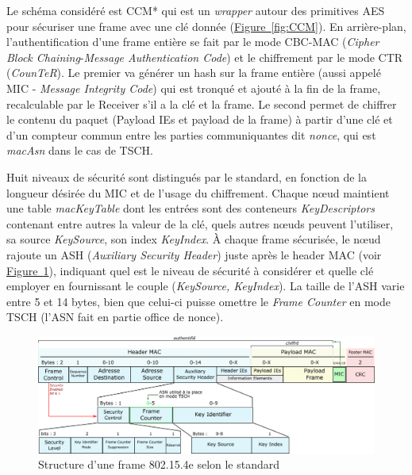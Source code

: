 \documentclass[]{report}
\newcommand{\wordlink}[2]{\hyperref[#2]{#1~\ref{#2}}}
\begin{document}
\par Le schéma considéré est CCM* qui est un \textit{wrapper} autour des primitives AES pour sécuriser une frame avec une clé donnée (\wordlink{Figure}{fig:CCM}). En arrière-plan, l'authentification d'une frame entière se fait par le mode CBC-MAC (\textit{Cipher Block Chaining}-\textit{Message Authentication Code}) et le chiffrement par le mode CTR (\textit{CounTeR}). Le premier va générer un hash sur la frame entière (aussi appelé MIC - \textit{Message Integrity Code}) qui est tronqué et ajouté à la fin de la frame, recalculable par le Receiver s'il a la clé et la frame. Le second permet de chiffrer le contenu du paquet (Payload IEs et payload de la frame) à partir d'une clé et d'un compteur commun entre les parties communiquantes dit \textit{nonce}, qui est \textit{macAsn} dans le cas de TSCH.\\

\par Huit niveaux de sécurité sont distingués par le standard, en fonction de la longueur désirée du MIC et de l'usage du chiffrement. Chaque nœud maintient une table \textit{macKeyTable} dont les entrées sont des conteneurs \textit{KeyDescriptors} contenant entre autres la valeur de la clé, quels autres nœuds peuvent l'utiliser, sa source \textit{KeySource}, son index \textit{KeyIndex}. À chaque frame sécurisée, le nœud rajoute un ASH (\textit{Auxiliary Security Header}) juste après le header MAC (voir \wordlink{Figure}{fig:IEEE802.15.4_frame}), indiquant quel est le niveau de sécurité à considérer et quelle clé employer en fournissant le couple (\textit{KeySource, KeyIndex}). La taille de l'ASH varie entre 5 et 14 bytes, bien que celui-ci puisse omettre le \textit{Frame Counter} en mode TSCH (l'ASN fait en partie office de nonce).

\vspace{0.2cm}

	\begin{figure}[!ht]
	\centering
	\includegraphics[width=\linewidth]{IEEE802_15_4-MAC}
	\caption{Structure d'une frame 802.15.4e selon le standard \cite{IEEE802.15.4}}
	\label{fig:IEEE802.15.4_frame}
	\end{figure}
\end{document}
